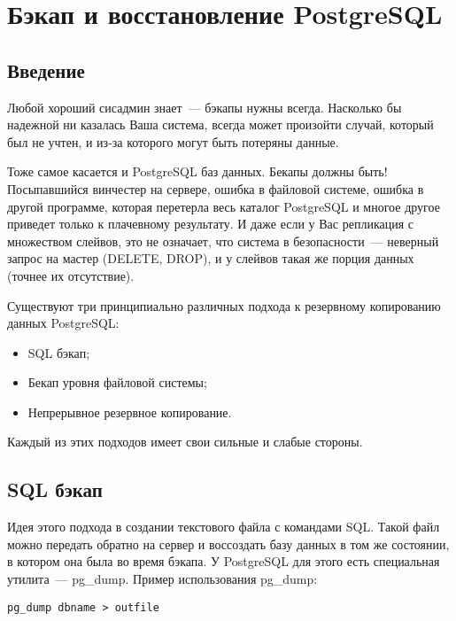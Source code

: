 \chapter{Бэкап и восстановление PostgreSQL}
\begin{epigraphs}
\end{epigraphs}
\section{Введение}
Любой хороший сисадмин знает~--- бэкапы нужны всегда.
Насколько бы надежной ни казалась Ваша система, всегда может произойти случай, который был не учтен, и из-за которого
могут быть потеряны данные.

Тоже самое касается и PostgreSQL баз данных. Бекапы должны быть! Посыпавшийся винчестер на сервере, ошибка в файловой системе,
ошибка в другой программе, которая перетерла весь каталог PostgreSQL и многое другое приведет только к плачевному результату.
И даже если у Вас репликация с множеством слейвов,
это не означает, что система в безопасности~--- неверный запрос на мастер (DELETE, DROP), и у слейвов такая же порция данных
(точнее их отсутствие).

Существуют три принципиально различных подхода к резервному копированию данных PostgreSQL:
\begin{itemize}
\item SQL бэкап;
\item Бекап уровня файловой системы;
\item Непрерывное резервное копирование.
\end{itemize}
Каждый из этих подходов имеет свои сильные и слабые стороны.


\section{SQL бэкап}
Идея этого подхода в создании текстового файла с командами SQL. Такой файл можно передать обратно на сервер
и воссоздать базу данных в том же состоянии, в котором она была во время бэкапа.
У PostgreSQL для этого есть специальная утилита~--- pg\_dump. Пример использования pg\_dump:
\begin{lstlisting}[label=lst:backups1,caption=Создаем бэкап с помощью pg\_dump]
pg_dump dbname > outfile
\end{lstlisting}

